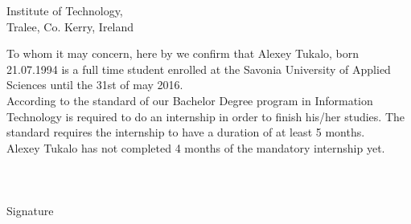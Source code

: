 \documentclass[english]{article}
\date{}
\begin{document}
\begin{flushright}
 Institute of Technology,\\
 Tralee, Co. Kerry, Ireland\\
\end{flushright}


To whom it may concern, here by we confirm that Alexey Tukalo, born 21.07.1994 is a full time student enrolled at the Savonia University of Applied Sciences until the 31st of may 2016.\\
According to the standard of our Bachelor Degree program in Information Technology is required to do an internship in order to finish his/her studies. The standard requires the internship to have a duration of at least 5 months. \\ Alexey Tukalo has not completed 4 months of the mandatory internship yet.\\
\\\\\\
Signature\hspace{0.5cm} \makebox[1.5in]{\hrulefill}
\end{document}
